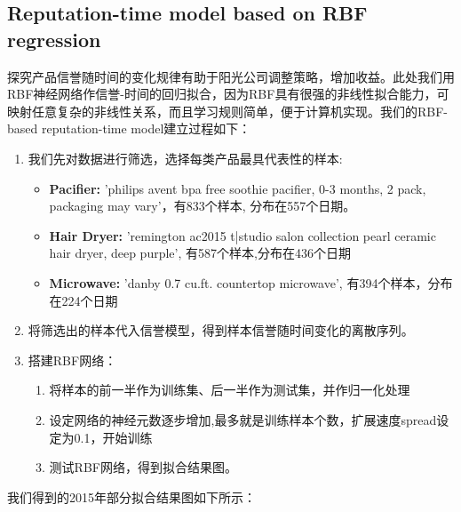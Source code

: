 \documentclass{mcmthesis}
\begin{document}
\subsection{Reputation-time model based on RBF regression}
探究产品信誉随时间的变化规律有助于阳光公司调整策略，增加收益。此处我们用RBF神经网络作信誉-时间的回归拟合，因为RBF具有很强的非线性拟合能力，可映射任意复杂的非线性关系，而且学习规则简单，便于计算机实现。我们的RBF-based reputation-time model建立过程如下：
\begin{enumerate}
	\item 我们先对数据进行筛选，选择每类产品最具代表性的样本:
	\begin{itemize}
		\item \textbf{Pacifier: }'philips avent bpa free soothie pacifier, 0-3 months, 2 pack, packaging may vary'，有833个样本, 分布在557个日期。
		\item \textbf{Hair Dryer: }'remington ac2015 t|studio salon collection pearl ceramic hair dryer, deep purple', 有587个样本,分布在436个日期
		\item \textbf{Microwave: }'danby 0.7 cu.ft. countertop microwave', 有394个样本，分布在224个日期
	\end{itemize}
	\item 将筛选出的样本代入信誉模型，得到样本信誉随时间变化的离散序列。
	\item 搭建RBF网络：
	\begin{enumerate}
		\item 将样本的前一半作为训练集、后一半作为测试集，并作归一化处理
		\item 设定网络的神经元数逐步增加,最多就是训练样本个数，扩展速度spread设定为0.1，开始训练
		\item 测试RBF网络，得到拟合结果图。
	\end{enumerate}
\end{enumerate}
我们得到的2015年部分拟合结果图如下所示：\\
\end{document}
